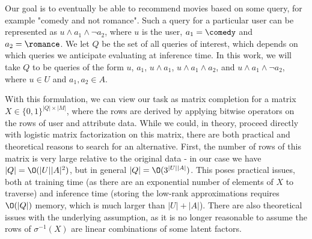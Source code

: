 Our goal is to eventually be able to recommend movies based on some query, for example "comedy and not romance". Such a query for a particular user can be represented as $u \wedge a_1 \wedge \neg a_2$, where $u$ is the user, $a_1 = \comedy$ and $a_2=\romance$. We let $Q$ be the set of all queries of interest, which depends on which queries we anticipate evaluating at inference time.
In this work, we will take $Q$ to be queries of the form $u$, $a_1$, $u \wedge a_1$, $u \wedge a_1 \wedge a_2$, and $u \wedge a_1 \wedge \neg a_2$, where $u \in U$ and $a_1, a_2 \in A$.

With this formulation, we can view our task as matrix completion for a matrix $X \in \{0,1\}^{|Q| \times |M|}$, where the rows are derived by applying bitwise operators on the rows of user and attribute data. While we could, in theory, proceed directly with logistic matrix factorization on this matrix, there are both practical and theoretical reasons to search for an alternative. First, the number of rows of this matrix is very large relative to the original data - in our case we have $|Q| = \O(|U||A|^2)$, but in general $|Q| = \O(3^{|U||A|})$. This poses practical issues, both at training time (as there are an exponential number of elements of $X$ to traverse) and inference time (storing the low-rank approximations requires $\O(|Q|)$ memory, which is much larger than $|U| + |A|$). There are also theoretical issues with the underlying assumption, as it is no longer reasonable to assume the rows of $\sigma^{-1}(X)$ are linear combinations of some latent factors.





